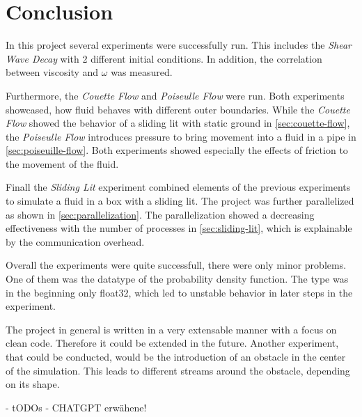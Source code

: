 \chapter{Conclusion}\label{ch:conclusion}
In this project several experiments were successfully run.
This includes the \textit{Shear Wave Decay} with 2 different initial conditions.
In addition, the correlation between viscosity and $\omega$ was measured.

Furthermore, the \textit{Couette Flow} and \textit{Poiseulle Flow} were run.
Both experiments showcased, how fluid behaves with different outer boundaries.
While the \textit{Couette Flow} showed the behavior of a sliding lit with static ground in \cref{sec:couette-flow}, the \textit{Poiseulle Flow} introduces pressure to bring movement into a fluid in a pipe in \cref{sec:poiseuille-flow}.
Both experiments showed especially the effects of friction to the movement of the fluid.

Finall the \textit{Sliding Lit} experiment combined elements of the previous experiments to simulate a fluid in a box with a sliding lit.
The project was further parallelized as shown in \cref{sec:parallelization}.
The parallelization showed a decreasing effectiveness with the number of processes in \cref{sec:sliding-lit}, which is explainable by the communication overhead.
\newline

Overall the experiments were quite successfull, there were only minor problems.
One of them was the datatype of the probability density function.
The type was in the beginning only float32, which led to unstable behavior in later steps in the experiment.
\newline

The project in general is written in a very extensable manner with a focus on clean code.
Therefore it could be extended in the future.
Another experiment, that could be conducted, would be the introduction of an obstacle in the center of the simulation.
This leads to different streams around the obstacle, depending on its shape.


- tODOs
- CHATGPT erwähene!